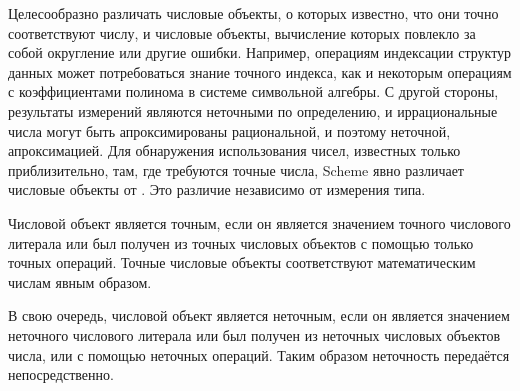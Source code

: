 Целесообразно различать числовые объекты, о которых известно, что они точно
соответствуют числу, и числовые объекты, вычисление которых повлекло за собой округление или
другие ошибки. Например, операциям индексации структур данных может потребоваться знание точного
индекса, как и некоторым операциям с коэффициентами полинома в системе символьной алгебры. С
другой стороны, результаты измерений являются неточными по определению, и иррациональные
числа могут быть апроксимированы рациональной, и поэтому неточной, апроксимацией. Для обнаружения
использования чисел, известных только приблизительно, там, где требуются точные числа,
Scheme явно различает  числовые объекты от . Это
различие независимо от измерения типа.

Числовой объект является точным, если он является значением точного числового литерала или был
получен из точных числовых объектов с помощью только точных операций. Точные числовые объекты
соответствуют математическим числам явным образом.

В свою очередь, числовой объект является неточным, если он является значением неточного
числового литерала или был получен из неточных числовых объектов числа, или с помощью неточных
операций. Таким образом неточность передаётся непосредственно.

